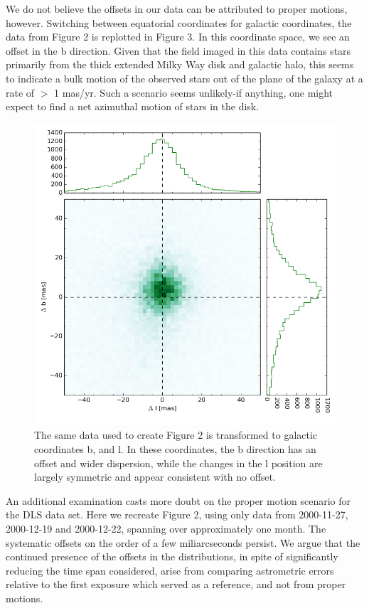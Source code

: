 \documentclass[modern]{aastex61}
\begin{document}
We do not believe the offsets in our data can be attributed to proper motions, however. Switching between equatorial coordinates for galactic coordinates, the data from Figure 2 is replotted in Figure 3. In this coordinate space, we see an offset in the b direction. Given that the field imaged in this data contains stars primarily from the thick extended Milky Way disk and galactic halo, this seems to indicate a bulk motion of the observed stars out of the plane of the galaxy at a rate of $>$ 1 mas/yr. Such a scenario seems unlikely-if anything, one might expect to find a net azimuthal motion of stars in the disk. 

\begin{figure}[h!]
	\includegraphics[width=.9\textwidth]{tech_memo_b_l.png}
    \caption{The same data used to create Figure 2 is transformed to galactic coordinates b, and l. In these coordinates, the b direction has an offset and wider dispersion, while the changes in the l position are largely symmetric and appear consistent with no offset. }
\end{figure}

An additional examination casts more doubt on the proper motion scenario for the DLS data set. Here we recreate Figure 2, using only data from 2000-11-27, 2000-12-19 and 2000-12-22, spanning over approximately one month. The systematic offsets on the order of a few miliarcseconds persist. We argue that the continued presence of the offsets in the distributions, in spite of significantly reducing the time span considered, arise from comparing astrometric errors relative to the first exposure which served as a reference, and not from proper motions. 
\end{document}
